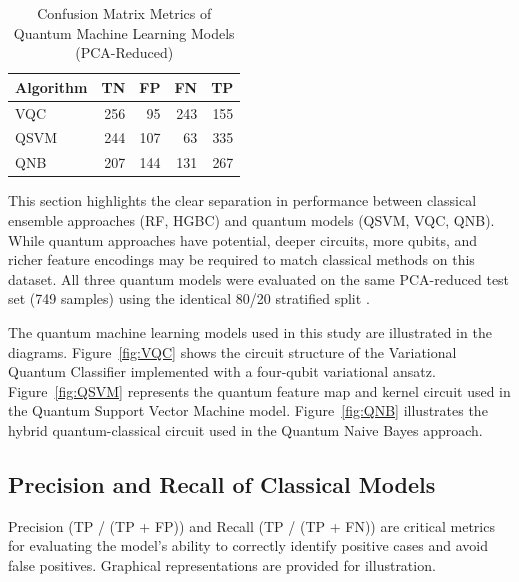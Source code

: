 \documentclass[runningheads]{llncs}
\begin{document}
\begin{table}[ht]
\centering
\caption{Confusion Matrix Metrics of Quantum Machine Learning Models (PCA-Reduced)}
\label{tab:qml_metrics}
\begin{tabular}{lrrrr}
\toprule
\textbf{Algorithm} & \textbf{TN} & \textbf{FP} & \textbf{FN} & \textbf{TP} \\
\midrule
VQC  & 256 & 95 & 243 & 155 \\
QSVM & 244 & 107 & 63 & 335 \\
QNB  & 207 & 144 & 131 & 267 \\
\bottomrule
\end{tabular}
\end{table}

This section highlights the clear separation in performance between classical ensemble approaches (RF, HGBC) and quantum models (QSVM, VQC, QNB). While quantum approaches have potential, deeper circuits, more qubits, and richer feature encodings may be required to match classical methods on this dataset. All three quantum models were evaluated on the same PCA-reduced test set (749 samples) using the identical 80/20 stratified split \cite{bishop2006}.

The quantum machine learning models used in this study are illustrated in the diagrams. Figure~\ref{fig:VQC} shows the circuit structure of the Variational Quantum Classifier implemented with a four-qubit variational ansatz. Figure~\ref{fig:QSVM} represents the quantum feature map and kernel circuit used in the Quantum Support Vector Machine model. Figure~\ref{fig:QNB} illustrates the hybrid quantum-classical circuit used in the Quantum Naive Bayes approach.

\subsection{Precision and Recall of Classical Models}\label{sec:precision_recall}


Precision (TP / (TP + FP)) and Recall (TP / (TP + FN)) are critical metrics for evaluating the model's ability to correctly identify positive cases and avoid false positives. Graphical representations are provided for illustration.
\end{document}
